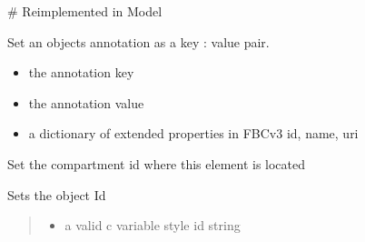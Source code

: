 \documentclass[letterpaper,10pt,english]{sphinxmanual}
\begin{document}
\begin{fulllineitems}
\begin{fulllineitems}
\begin{itemize}
\end{itemize}

\sphinxAtStartPar
\# Reimplemented in Model

\end{fulllineitems}


\begin{fulllineitems}
\label{\detokenize{modules_doc:cbmpy.CBModel.Fbase.setAnnotation}}
\pysigstartsignatures
{}
\pysigstopsignatures
\sphinxAtStartPar
Set an objects annotation as a key : value pair.
\begin{itemize}
\item {} 
\sphinxAtStartPar
{} the annotation key

\item {} 
\sphinxAtStartPar
{} the annotation value

\item {} 
\sphinxAtStartPar
{} a dictionary of extended properties in FBCv3 id, name, uri

\end{itemize}

\end{fulllineitems}


\begin{fulllineitems}
\label{\detokenize{modules_doc:cbmpy.CBModel.Fbase.setCompartmentId}}
\pysigstartsignatures
{}
\pysigstopsignatures
\sphinxAtStartPar
Set the compartment id where this element is located

\end{fulllineitems}


\begin{fulllineitems}
\label{\detokenize{modules_doc:cbmpy.CBModel.Fbase.setId}}
\pysigstartsignatures
{}
\pysigstopsignatures
\sphinxAtStartPar
Sets the object Id
\begin{quote}
\begin{itemize}
\item {} 
\sphinxAtStartPar
{} a valid c variable style id string


\end{itemize}
\end{quote}
\end{fulllineitems}
\end{fulllineitems}
\end{document}
